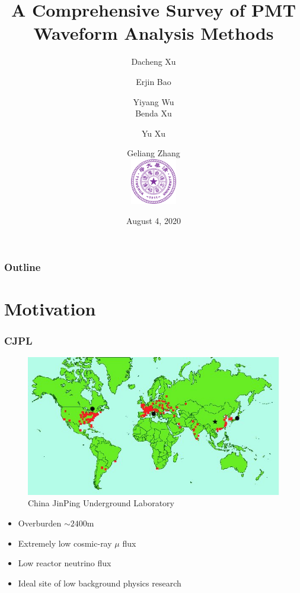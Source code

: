 \documentclass{beamer}
\title[Waveform Analysis]{A Comprehensive Survey of PMT Waveform Analysis Methods}
\author[Dacheng Xu]{Dacheng Xu \and Erjin Bao \and Yiyang Wu  \\ Benda Xu \and Yu Xu \and Geliang Zhang \\ [8mm] \includegraphics[height=2cm]{img/Tsinghua_University_Logo.png}}
\date[DANCE]{August 4, 2020}
\begin{document}
\frame{\titlepage}

\begin{frame}[noframenumbering]
\frametitle{Outline}
\thispagestyle{empty}
\tableofcontents
\end{frame}

\section{Motivation}
\begin{frame}
\setcounter{page}{0}
\frametitle{CJPL}
\begin{figure}
    \centering
    \caption{China JinPing Underground Laboratory}
    \includegraphics[width=0.65\linewidth]{img/WorldMap.jpg}
\end{figure}
\begin{itemize}
    \item Overburden $\sim2400\mathrm{m}$
    \item Extremely low cosmic-ray $\mu$ flux
    \item Low reactor neutrino flux
    \item Ideal site of low background physics research
\end{itemize}
\end{frame}
\end{document}
